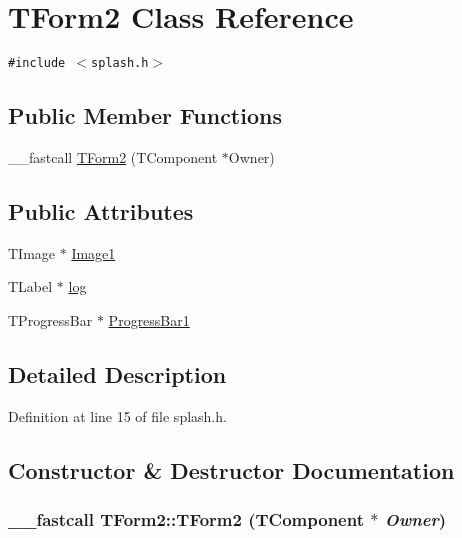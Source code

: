 \hypertarget{classTForm2}{
\section{TForm2 Class Reference}
\label{classTForm2}
}
{\tt \#include $<$splash.h$>$}

\subsection*{Public Member Functions}
\begin{CompactItemize}
\item 
\_\-\_\-fastcall \hyperlink{classTForm2_5a315602ac862095f2846b581c735803}{TForm2} (TComponent $\ast$Owner)
\end{CompactItemize}
\subsection*{Public Attributes}
\begin{CompactItemize}
\item 
TImage $\ast$ \hyperlink{classTForm2_f53196944e6698dc1318f506fa6f51fa}{Image1}
\item 
TLabel $\ast$ \hyperlink{classTForm2_db78dd561a0e8a3cf278d85c61f70cd8}{log}
\item 
TProgressBar $\ast$ \hyperlink{classTForm2_931733bf3a3339d75e224dbe9ddc24fb}{ProgressBar1}
\end{CompactItemize}


\subsection{Detailed Description}


Definition at line 15 of file splash.h.

\subsection{Constructor \& Destructor Documentation}
\hypertarget{classTForm2_5a315602ac862095f2846b581c735803}{
\subsubsection[TForm2]{\setlength{\rightskip}{0pt plus 5cm}\_\-\_\-fastcall TForm2::TForm2 (TComponent $\ast$ {\em Owner})}}
\label{classTForm2_5a315602ac862095f2846b581c735803}




